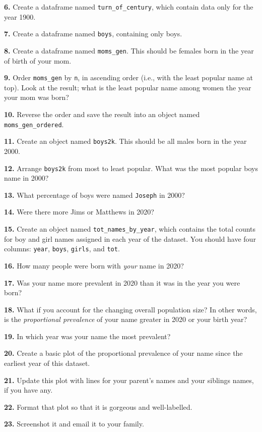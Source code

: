 \documentclass[]{book}
\begin{document}
\textbf{6.} Create a dataframe named \texttt{turn\_of\_century}, which contain data only for the year 1900.

\textbf{7.} Create a dataframe named \texttt{boys}, containing only boys.

\textbf{8.} Create a dataframe named \texttt{moms\_gen}. This should be females born in the year of birth of your mom.

\textbf{9.} Order \texttt{moms\_gen} by \texttt{n}, in ascending order (i.e., with the least popular name at top). Look at the result; what is the least popular name among women the year your mom was born?

\textbf{10.} Reverse the order and save the result into an object named \texttt{moms\_gen\_ordered}.

\textbf{11.} Create an object named \texttt{boys2k}. This should be all males born in the year 2000.

\textbf{12.} Arrange \texttt{boys2k} from most to least popular. What was the most popular boys name in 2000?

\textbf{13.} What percentage of boys were named \texttt{Joseph} in 2000?

\textbf{14.} Were there more Jims or Matthews in 2020?

\textbf{15.} Create an object named \texttt{tot\_names\_by\_year}, which contains the total counts for boy and girl names assigned in each year of the dataset. You should have four columns: \texttt{year}, \texttt{boys}, \texttt{girls}, and \texttt{tot}.

\textbf{16.} How many people were born with \emph{your} name in 2020?

\textbf{17.} Was your name more prevalent in 2020 than it was in the year you were born?

\textbf{18.} What if you account for the changing overall population size? In other words, is the \emph{proportional prevalence} of your name greater in 2020 or your birth year?

\textbf{19.} In which year was your name the most prevalent?

\textbf{20.} Create a basic plot of the proportional prevalence of your name since the earliest year of this dataset.

\textbf{21.} Update this plot with lines for your parent's names and your siblings names, if you have any.

\textbf{22.} Format that plot so that it is gorgeous and well-labelled.

\textbf{23.} Screenshot it and email it to your family.
\end{document}

